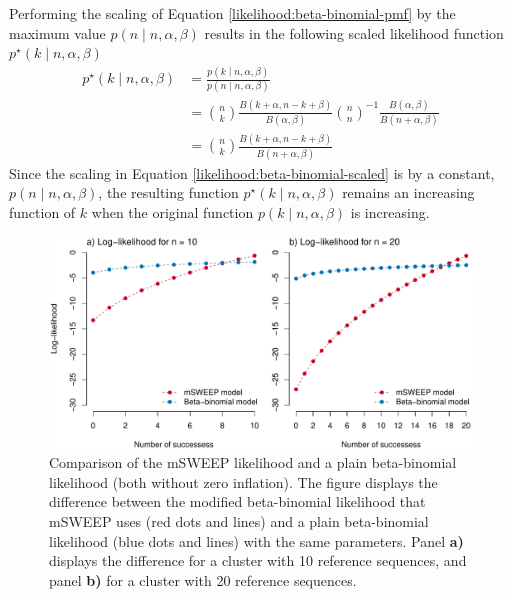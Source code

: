 \documentclass[officiallayout]{tktla}
\begin{document}
Performing the scaling of Equation \ref{likelihood:beta-binomial-pmf}
by the maximum value $p\left(n \middle| n, \alpha, \beta\right)$
results in the following scaled likelihood function $p^{\star}\left(k
\middle| n, \alpha, \beta\right)$
\begin{equation}
  \label{likelihood:beta-binomial-scaled}
  \begin{aligned}
    p^{\star}\left(k \middle| n, \alpha, \beta\right) &= \frac{p\left(k \middle| n, \alpha, \beta\right)}{p\left(n \middle| n, \alpha, \beta\right)} \\
    &= \binom{n}{k}\frac{B\left(k + \alpha, n - k + \beta\right)}{B\left(\alpha, \beta\right)} \binom{n}{n}^{-1}\frac{B\left(\alpha, \beta\right)}{B\left(n + \alpha, \beta\right)} \\
    &= \binom{n}{k}\frac{B\left(k + \alpha, n - k + \beta\right)}{B\left(n + \alpha, \beta\right)}
  \end{aligned}
\end{equation}
Since the scaling in Equation \ref{likelihood:beta-binomial-scaled} is
by a constant, $p\left(n \middle| n, \alpha, \beta\right)$, the
resulting function $p^{\star}\left(k \middle| n, \alpha, \beta\right)$
remains an increasing function of $k$ when the original function
$p\left(k \middle| n, \alpha, \beta\right)$ is increasing.

\begin{figure}[!h]
  \label{fig:msweep-vs-beta-binomial}
    \centering
    \includegraphics[width=\textwidth,keepaspectratio]{img/mSWEEP_likelihood.pdf}
    \caption{Comparison of the mSWEEP likelihood and a plain beta-binomial likelihood (both without zero inflation). The figure displays the difference between the modified beta-binomial likelihood that mSWEEP uses (red dots and lines) and a plain beta-binomial likelihood (blue dots and lines) with the same parameters. Panel \textbf{a)} displays the difference for a cluster with 10 reference sequences, and panel \textbf{b)} for a cluster with 20 reference sequences.}
\end{figure}
\end{document}
